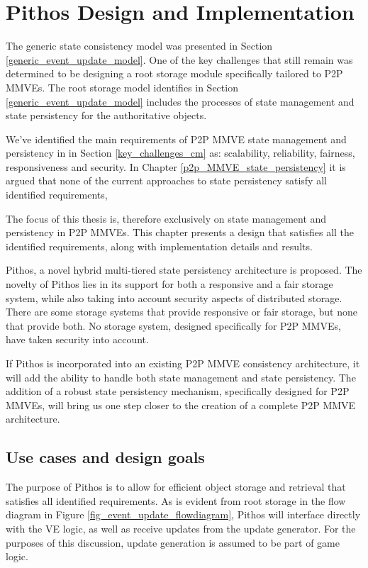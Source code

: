 \chapter{Pithos Design and Implementation}
\label{chp:DESIGN}

The generic state consistency model was presented in Section \ref{generic_event_update_model}. One of the key challenges that still remain was determined to be designing a root storage module specifically tailored to P2P MMVEs. The root storage model identifies in Section \ref{generic_event_update_model} includes the processes of state management and state persistency for the authoritative objects.

We've identified the main requirements of P2P MMVE state management and persistency in in Section \ref{key_challenges_cm} as: scalability,
reliability, fairness, responsiveness and security. In Chapter \ref{p2p_MMVE_state_persistency} it is argued that none of the current approaches to state persistency satisfy all identified requirements,

The focus of this thesis is, therefore exclusively on state management and persistency in P2P MMVEs. This chapter presents a design that satisfies all the identified requirements, along with implementation details and results.

Pithos, a novel hybrid multi-tiered state persistency architecture is
proposed. The novelty of Pithos lies in its support for both a responsive and a fair storage system, while also taking into account security aspects
of distributed storage. There are some storage systems that provide responsive or fair storage, but none that provide both. No storage system, designed specifically for P2P MMVEs, have taken security into account.

If Pithos is incorporated into an existing P2P MMVE consistency architecture, it will add the ability to handle both state management and state persistency. The addition of a robust state persistency mechanism, specifically designed for P2P MMVEs, will bring us one step closer to
the creation of a complete P2P MMVE architecture.

\section{Use cases and design goals}
\label{use_cases_goals}

The purpose of Pithos is to allow for efficient object storage and retrieval that satisfies all identified requirements. As is evident from root storage in the flow diagram in Figure \ref{fig_event_update_flowdiagram}, Pithos will interface directly with the VE logic, as well as receive updates from the update generator. For the purposes of this discussion, update generation is assumed to be part of game logic.

